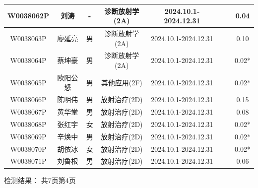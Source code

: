 \begin{table}[H]
\begin{tabular}{|c|c|c|c|c|c|c|c|}
\hline
W0038062P & 刘涛 & - & 诊断放射学(2A) & 2024.10.1-2024.12.31 &  &  & 0.04 \\
\hline
W0038063P & 廖延亮 & 男 & 诊断放射学(2A) & 2024.10.1-2024.12.31 &  &  & 0.10 \\
\hline
W0038064P & 蔡坤豪 & 男 & 诊断放射学(2A) & 2024.10.1-2024.12.31 &  &  & 0.02* \\
\hline
W0038065P & 欧阳公怒 & 男 & 其他应用(2F) & 2024.10.1-2024.12.31 &  &  & 0.02* \\
\hline
W0038066P & 陈明伟 & 男 & 放射治疗(2D) & 2024.10.1-2024.12.31 &  &  & 0.15 \\
\hline
W0038067P & 黄华堂 & 男 & 放射治疗(2D) & 2024.10.1-2024.12.31 &  &  & 0.08 \\
\hline
W0038068P & 张红宇 & 女 & 放射治疗(2D) & 2024.10.1-2024.12.31 &  &  & 0.02* \\
\hline
W0038069P & 辛焕中 & 男 & 放射治疗(2D) & 2024.10.1-2024.12.31 &  &  & 0.02* \\
\hline
W0038070P & 胡依冰 & 女 & 放射治疗(2D) & 2024.10.1-2024.12.31 &  &  & 0.02* \\
\hline
W0038071P & 刘鲁根 & 男 & 放射治疗(2D) & 2024.10.1-2024.12.31 &  &  & 0.06 \\
\hline
\end{tabular}
\end{table}


检测结果：
共7页第4页

